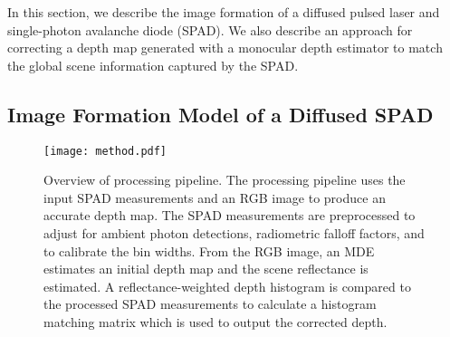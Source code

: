 In this section, we describe the image formation of a diffused pulsed laser and single-photon avalanche diode (SPAD). We also describe an approach for correcting a depth map generated with a monocular depth estimator to match the global scene information captured by the SPAD.


\subsection{Image Formation Model of a Diffused SPAD}

\begin{figure}[t!]
  \centering
  \texttt{[image: method.pdf]}
  \caption{Overview of processing pipeline. The processing pipeline uses
      the input SPAD measurements and an RGB image to produce an accurate depth
      map. The SPAD measurements are preprocessed to adjust for ambient photon
      detections, radiometric falloff factors, and to calibrate the bin widths.
      From the RGB image, an MDE estimates an initial depth map
      and the scene reflectance is estimated. A reflectance-weighted
      depth histogram is compared to the processed SPAD measurements to
      calculate a histogram matching matrix which is used to output the corrected depth.
  }
  \label{fig:pipeline}
\end{figure}


